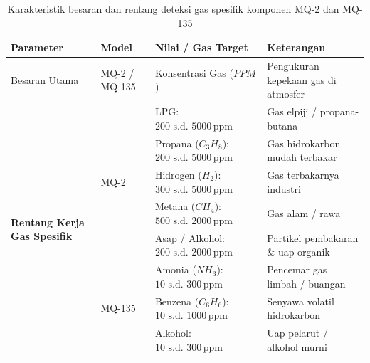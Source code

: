 \begin{table}[H]
	\centering
	\caption{Karakteristik besaran dan rentang deteksi gas spesifik komponen MQ-2 dan MQ-135}
	\label{tab:mq_karakteristik_besaran}
	\small
	\begin{tabularx}{\textwidth}{@{} p{2.4cm} l X X @{}}
		\toprule
		Parameter               & Model                                         & Nilai / Gas Target                                     & Keterangan                                     \\
		\midrule
		Besaran Utama           & MQ-2 / MQ-135                                 & Konsentrasi Gas ($PPM$)                                & Pengukuran kepekaan gas di atmosfer            \\
		\midrule
		\multirow{10}{*}{\parbox{2.2cm}{\textbf{Rentang Kerja Gas Spesifik}}}
		                        & \multirow{5}{*}{MQ-2}
		                        & LPG: $200\text{ s.d. }5000\,\text{ppm}$           & Gas elpiji / propana-butana                                                                             \\
		                        &                                               & Propana ($C_3H_8$): $200\text{ s.d. }5000\,\text{ppm}$     & Gas hidrokarbon mudah terbakar                 \\
		                        &                                               & Hidrogen ($H_2$): $300\text{ s.d. }5000\,\text{ppm}$       & Gas terbakarnya industri                       \\
		                        &                                               & Metana ($CH_4$): $500\text{ s.d. }2000\,\text{ppm}$        & Gas alam / rawa                                \\
		                        &                                               & Asap / Alkohol: $200\text{ s.d. }2000\,\text{ppm}$         & Partikel pembakaran \& uap organik             \\
		\cmidrule{2-4}
		                        & \multirow{5}{*}{MQ-135}
		                        & Amonia ($NH_3$): $10\text{ s.d. }300\,\text{ppm}$ & Pencemar gas limbah / buangan                                                                           \\
		                        &                                               & Benzena ($C_6H_6$): $10\text{ s.d. }1000\,\text{ppm}$      & Senyawa volatil hidrokarbon                    \\
		                        &                                               & Alkohol: $10\text{ s.d. }300\,\text{ppm}$                  & Uap pelarut / alkohol murni                    \\

\end{tabularx}
\end{table}
